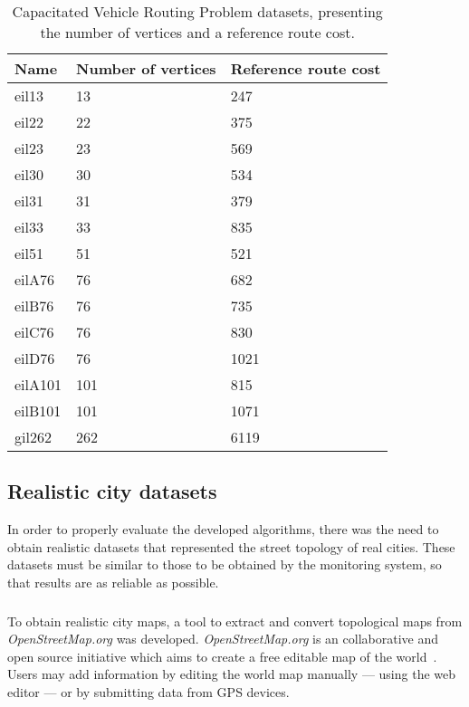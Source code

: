 \begin{table}[H]
  \caption{Capacitated Vehicle Routing Problem datasets, presenting the
  number of vertices and a reference route cost.}
  \begin{center}
    \begin{tabular}{lll}
      \hline
      Name & Number of vertices & Reference route cost \\
      \hline
      eil13   &   13 &   247 \\
      eil22   &   22 &   375 \\
      eil23   &   23 &   569 \\
      eil30   &   30 &   534 \\
      eil31   &   31 &   379 \\
      eil33   &   33 &   835 \\
      eil51   &   51 &   521 \\
      eilA76  &   76 &   682 \\
      eilB76  &   76 &   735 \\
      eilC76  &   76 &   830 \\
      eilD76  &   76 &  1021 \\
      eilA101 &  101 &   815 \\
      eilB101 &  101 &  1071 \\
      gil262  &  262 &  6119 \\
      \hline
    \end{tabular}
  \end{center}
  \label{tab:tsplib-cvrp}
\end{table}



\newpage
\subsection{Realistic city datasets}
\label{section:realistic-datasets}

In order to properly evaluate the developed algorithms, there was the need to
obtain realistic datasets that represented the street topology of real cities.
These datasets must be similar to those to be obtained by the monitoring
system, so that results are as reliable as possible.


\subsubsection{\osm{}}
\label{section:osm}

To obtain realistic city maps, a tool to extract and convert topological maps
from \textit{OpenStreetMap.org} was developed. \textit{OpenStreetMap.org} is an
collaborative and open source initiative which aims to create a free editable
map of the world~\cite{Mordechai2008}. Users may add information by editing the
world map manually --- using the web editor --- or by submitting data from GPS
devices.

